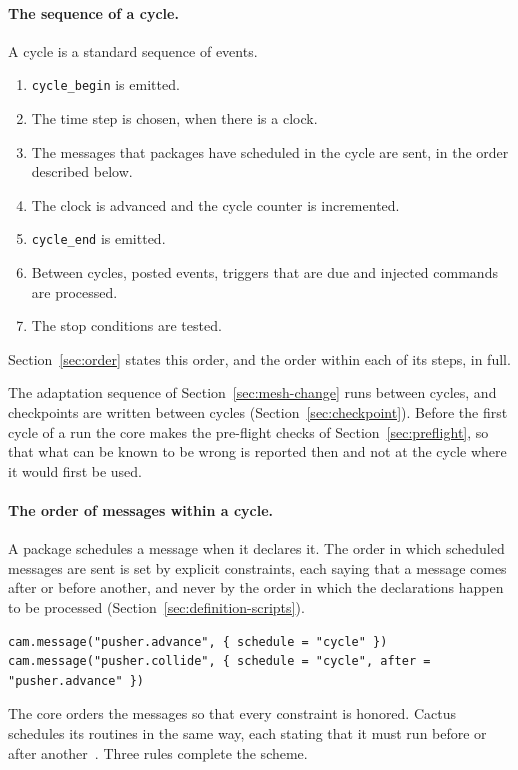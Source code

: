 \documentclass[11pt,a4paper]{article}
\newcommand{\code}[1]{\texttt{#1}}
\begin{document}
\paragraph{The sequence of a cycle.}  A cycle is a standard sequence of
events.

\begin{enumerate}
  \item \code{cycle\_begin} is emitted.
  \item The time step is chosen, when there is a clock.
  \item The messages that packages have scheduled in the cycle are sent, in
        the order described below.
  \item The clock is advanced and the cycle counter is incremented.
  \item \code{cycle\_end} is emitted.
  \item Between cycles, posted events, triggers that are due and injected
        commands are processed.
  \item The stop conditions are tested.
\end{enumerate}

Section~\ref{sec:order} states this order, and the order within each of its
steps, in full.

The adaptation sequence of Section~\ref{sec:mesh-change} runs between
cycles, and checkpoints are written between cycles
(Section~\ref{sec:checkpoint}).  Before the first cycle of a run the core makes the pre-flight
checks of Section~\ref{sec:preflight}, so that what can be known to be wrong
is reported then and not at the cycle where it would first be used.

\paragraph{The order of messages within a cycle.}  A package schedules a
message when it declares it.  The order in which scheduled messages are sent
is set by explicit constraints, each saying that a message comes after or
before another, and never by the order in which the declarations happen to
be processed (Section~\ref{sec:definition-scripts}).

\begin{lstlisting}[language={[5.3]Lua}]
cam.message("pusher.advance", { schedule = "cycle" })
cam.message("pusher.collide", { schedule = "cycle", after = "pusher.advance" })
\end{lstlisting}

The core orders the messages so that every constraint is honored.  Cactus
schedules its routines in the same way, each stating that it must run
before or after another~\cite{cactusguide}.  Three rules complete the
scheme.
\end{document}
